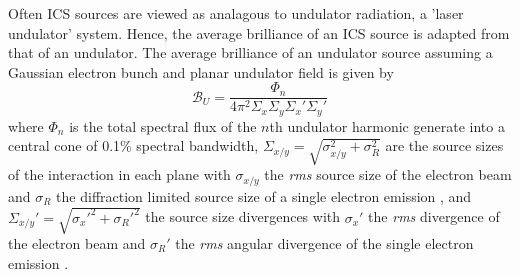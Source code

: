 \documentclass[../main.tex]{subfiles}
\begin{document}
Often ICS sources are viewed as analagous to undulator radiation, a 'laser undulator' system. Hence, the average brilliance of an ICS source is adapted from that of an undulator. The average brilliance of an undulator source assuming a Gaussian electron bunch and planar undulator field \cite{chao2013handbook} is given by 
\begin{equation}
\mathcal{B}_{U} = \frac{\Phi_{n}}{4\pi^{2}\Sigma_{x}\Sigma_{y}\Sigma_{x}'\Sigma_{y}'}
\label{eq:undulator_brightness}    
\end{equation}
where $\Phi_{n}$ is the total spectral flux of the $n$th undulator harmonic generate into a central cone of 0.1\% spectral bandwidth, $\Sigma_{x/y} = \sqrt{\sigma_{x/y}^{2}+\sigma_{R}^{2}}$ are the source sizes of the interaction in each plane with $\sigma_{x/y}$ the \textit{rms} source size of the electron beam and $\sigma_{R}$ the diffraction limited source size of a single electron emission \cite{kim1987brightness}, and $\Sigma_{x/y}' = \sqrt{\sigma_{x}'^{2}+\sigma_{R}'^{2}}$ the source size divergences with $\sigma_{x}'$ the \textit{rms} divergence of the electron beam and $\sigma_{R}'$ the \textit{rms} angular divergence of the single electron emission \cite{krinsky1983undulators}. 
\end{document}
